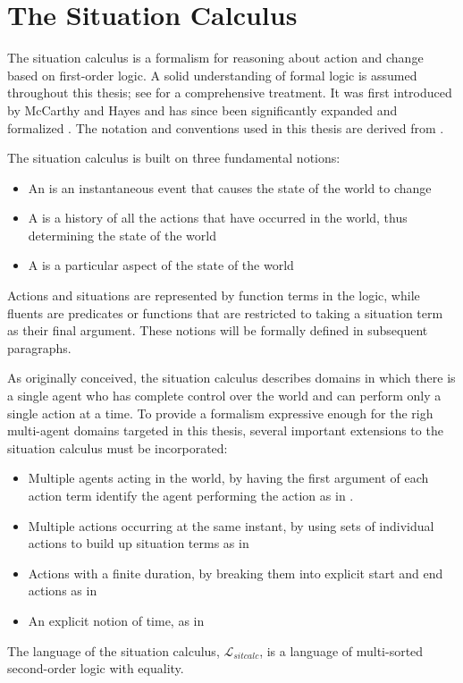 \section{The Situation Calculus}

The situation calculus is a formalism for reasoning about action and
change based on first-order logic. A solid understanding of formal
logic is assumed throughout this thesis; see \cite{fitting96fol_book}
for a comprehensive treatment. It was first introduced by McCarthy
and Hayes \cite{McCHay69sitcalc} and has since been significantly
expanded and formalized \cite{reiter91frameprob,pirri99contributions_sitcalc,levesque98sc_foundations}.
The notation and conventions used in this thesis are derived from
\cite{levesque98sc_foundations}.

The situation calculus is built on three fundamental notions: 

\begin{itemize}
\item An  is an instantaneous event that causes the state of
the world to change 
\item A  is a history of all the actions that have occurred
in the world, thus determining the state of the world 
\item A  is a particular aspect of the state of the world 
\end{itemize}
Actions and situations are represented by function terms in the logic,
while fluents are predicates or functions that are restricted to taking
a situation term as their final argument. These notions will be formally
defined in subsequent paragraphs.

As originally conceived, the situation calculus describes domains
in which there is a single agent who has complete control over the
world and can perform only a single action at a time. To provide a
formalism expressive enough for the righ multi-agent domains targeted
in this thesis, several important extensions to the situation calculus
must be incorporated: 

\begin{itemize}
\item Multiple agents acting in the world, by having the first argument
of each action term identify the agent performing the action as in
\cite{shapiro98specifying_ma_systems,shapiro01casl_feat_inter}. 
\item Multiple actions occurring at the same instant, by using sets of individual
actions to build up situation terms as in \cite{lin92sc_conc,pinto94temporal,reiter96sc_nat_conc} 
\item Actions with a finite duration, by breaking them into explicit start
and end actions as in \cite{pinto94temporal} 
\item An explicit notion of time, as in \cite{pinto94temporal,reiter96sc_nat_conc} 
\end{itemize}
The language of the situation calculus, $\mathcal{L}_{sitcalc}$,
is a language of multi-sorted second-order logic with equality.

